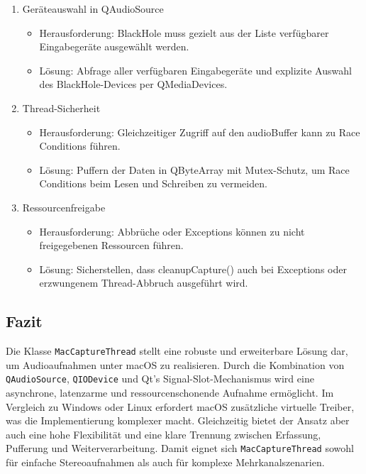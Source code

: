 \begin{enumerate}
 \item Geräteauswahl in QAudioSource
 \begin{itemize}
 \item Herausforderung: BlackHole muss gezielt aus der Liste verfügbarer Eingabegeräte ausgewählt werden.
\item  Lösung: Abfrage aller verfügbaren Eingabegeräte und explizite Auswahl des BlackHole-Devices per QMediaDevices.

\end{itemize}

\item Thread-Sicherheit

\begin{itemize}

\item Herausforderung: Gleichzeitiger Zugriff auf den audioBuffer kann zu Race Conditions führen.
\item  Lösung: Puffern der Daten in QByteArray mit Mutex-Schutz, um Race Conditions beim Lesen und Schreiben zu vermeiden.
\end{itemize}
 
 \item Ressourcenfreigabe
\begin{itemize}
\item Herausforderung: Abbrüche oder Exceptions können zu nicht freigegebenen Ressourcen führen.
\item Lösung: Sicherstellen, dass cleanupCapture() auch bei Exceptions oder erzwungenem Thread-Abbruch ausgeführt wird.
\end{itemize}
 
 \end{enumerate}


\subsection{Fazit}

Die Klasse \texttt{MacCaptureThread} stellt eine robuste und erweiterbare Lösung dar, um Audioaufnahmen unter macOS zu realisieren. Durch die Kombination von \texttt{QAudioSource}, \texttt{QIODevice} und Qt’s Signal-Slot-Mechanismus wird eine asynchrone, latenzarme und ressourcenschonende Aufnahme ermöglicht.  
Im Vergleich zu Windows oder Linux erfordert macOS zusätzliche virtuelle Treiber, was die Implementierung komplexer macht. Gleichzeitig bietet der Ansatz aber auch eine hohe Flexibilität und eine klare Trennung zwischen Erfassung, Pufferung und Weiterverarbeitung. Damit eignet sich \texttt{MacCaptureThread} sowohl für einfache Stereoaufnahmen als auch für komplexe Mehrkanalszenarien.


